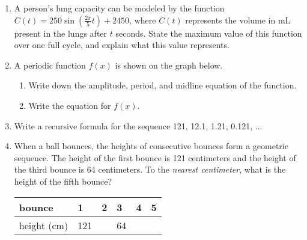 \documentclass[12pt, twoside]{article}
\begin{document}
\begin{enumerate}
\newpage
\item A person's lung capacity can be modeled by the function $\displaystyle C(t) = 250\sin(\frac{2\pi}{5} t) + 2450$, where $C(t)$ represents the volume in mL present in the lungs after $t$ seconds. State the maximum value of this function over one full cycle, and explain what this value represents. %
\vspace{5cm}

\item A periodic function $f(x)$ is shown on the graph below.
\begin{enumerate}
    \item Write down the amplitude, period, and midline equation of the function. \vspace{2cm}
    \begin{center}
        \end{center}
        \item Write the equation for $f(x)$.
    \end{enumerate}

\newpage
\item Write a recursive formula for the sequence 121, 12.1, 1.21, 0.121, $\ldots$ \vspace{3cm}

\item When a ball bounces, the heights of consecutive bounces form a geometric sequence. The height of the first bounce is 121 centimeters and the height of the third bounce is 64 centimeters. To the \emph{nearest centimeter}, what is the height of the fifth bounce? %
    \begin{center}
    \begin{tabular}{|p{3cm}|p{1cm}|p{1cm}|p{1cm}|p{1cm}|p{1cm}|}
        \hline
        bounce & 1 & 2 & 3 & 4 & 5 \\
        \hline
        height (cm) & 121 & & 64 & & \\[0.25cm]
        \hline
    \end{tabular}
    \end{center}
\vspace{5cm}


\end{enumerate}
\end{document}
